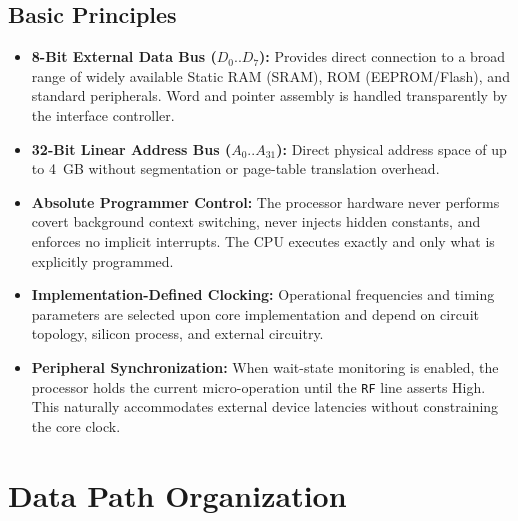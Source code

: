 \documentclass[11pt,a4paper]{article}
\begin{document}
\subsection{Basic Principles}

\begin{archcallout}[title={Key Architectural Characteristics of LIM2}]
\begin{itemize}
    \item \textbf{8-Bit External Data Bus (\(D_0..D_7\)):} Provides direct connection to a broad range of widely available Static RAM (SRAM), ROM (EEPROM/Flash), and standard peripherals. Word and pointer assembly is handled transparently by the interface controller.
    \item \textbf{32-Bit Linear Address Bus (\(A_0..A_{31}\)):} Direct physical address space of up to 4~GB without segmentation or page-table translation overhead.
    \item \textbf{Absolute Programmer Control:} The processor hardware never performs covert background context switching, never injects hidden constants, and enforces no implicit interrupts. The CPU executes exactly and only what is explicitly programmed.
    \item \textbf{Implementation-Defined Clocking:} Operational frequencies and timing parameters are selected upon core implementation and depend on circuit topology, silicon process, and external circuitry.
    \item \textbf{Peripheral Synchronization:} When wait-state monitoring is enabled, the processor holds the current micro-operation until the \texttt{RF} line asserts High. This naturally accommodates external device latencies without constraining the core clock.
\end{itemize}
\end{archcallout}

\section{Data Path Organization}
\end{document}
